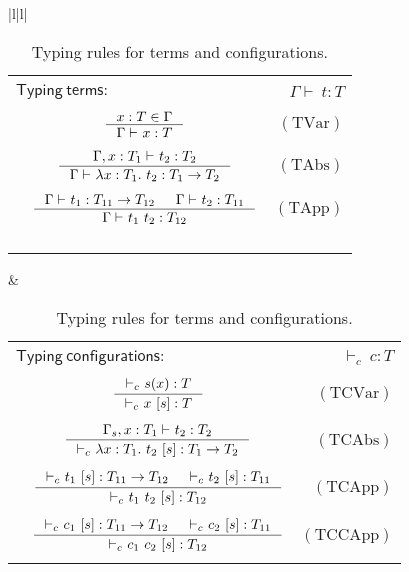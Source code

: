 \documentclass {article}
\newcommand\rulename[1]{\mathrm{(#1)}}
\newcommand{\app}[2]{#1 \ #2}
\newcommand{\appD}{t_1 \ t_2}
\newcommand{\absD}{\lambda x:T_1. \ t_2}
\newcommand{\conf}[2][s]{#2 \ [#1]}
\newcommand{\env}{{\Gamma \vdash \ }}
\newcommand{\envE}{{\Gamma , x:T_1 \vdash \ }}
\newcommand{\envEC}{{\Gamma_s , x:T_1 \vdash \ }}
\newcommand{\tyC}{{\vdash_c \ }}
\begin{document}
\begin{table}
\begin{center}
\hspace*{-1.8cm}
\begin{tabular}{|l|l|}
\hline
\begin{tabular}{l c r}
&&\\
\multicolumn{2}{l}{$\mathsf {Typing \ terms}:$}&$\env t:T$\\
&&\\
&$\inference {x:T \in \Gamma}{\env x:T}$&$\rulename{TVar}$\\
&&\\
&$\inference {\envE t_2:T_2}{\env \absD:T_1 \to T_2}$&$\rulename{TAbs}$\\
&&\\
&$\inference {\env t_1 : T_{11} \to T_{12} & \env t_2 : T_{11}}{\env \appD : T_{12}}$&$\rulename{TApp}$\\
&&\\
&&\\
&&\\
&&\\
\end{tabular}&
\begin{tabular}{l c r}
&&\\
\multicolumn{2}{l}{$\mathsf {Typing \ configurations}:$}&$\tyC c:T$\\
&&\\
&$\inference {\tyC s(x):T}{\tyC \conf {x}:T}$&$\rulename{TCVar}$\\
&&\\
&$\inference {\envEC t_2:T_2}{\tyC \conf {\absD} :T_1\to T_2}$&$\rulename{TCAbs}$\\
&&\\
&$\inference {\tyC \conf {t_1} : T_{11} \to T_{12} & \tyC \conf {t_2} : T_{11}}{\tyC  \conf {\appD} : T_{12}}$&$\rulename{TCApp}$\\
&&\\
&$\inference {\tyC \conf {c_1} : T_{11} \to T_{12} & \tyC \conf {c_2} : T_{11}}{\tyC  \conf {\app {c_1}{c_2}} : T_{12}}$&$\rulename{TCCApp}$\\
&&\\
\end{tabular}\\
\hline
\end{tabular}
\hspace*{-1cm}
\caption{Typing rules for terms and configurations.}
\label{tabla:sencillaA}
\end{center}
\end{table}
\end{document}
